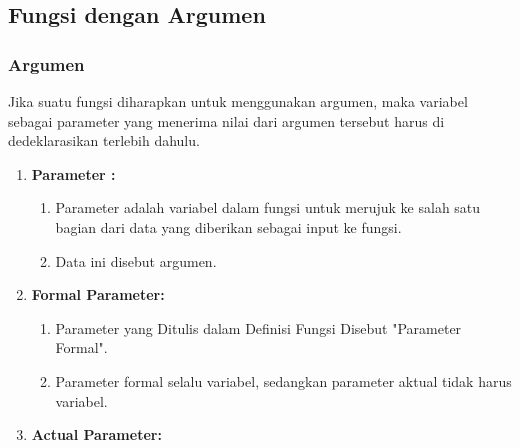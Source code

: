 \subsection{Fungsi dengan Argumen}

\subsubsection{Argumen}


Jika suatu fungsi diharapkan untuk menggunakan argumen, maka variabel sebagai parameter yang menerima nilai dari argumen tersebut harus di dedeklarasikan terlebih dahulu. \\
\begin{enumerate}
	\item  \textbf{Parameter :}
\begin{enumerate}
	\item Parameter adalah variabel dalam fungsi untuk merujuk ke salah satu bagian dari
	data yang diberikan sebagai input ke fungsi.
	\item Data ini disebut argumen.
	
\end{enumerate}

\item \textbf{Formal Parameter:}
\begin{enumerate}
	\item Parameter yang Ditulis dalam Definisi Fungsi Disebut "Parameter Formal".
	\item Parameter formal selalu variabel, sedangkan parameter aktual tidak harus variabel.
	
\end{enumerate}


\item \textbf{Actual Parameter:}
\begin{enumerate}
	

\end{enumerate}
\end{enumerate}
